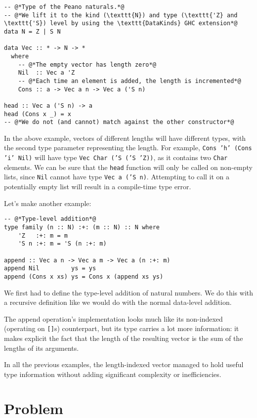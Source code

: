 \begin{lstlisting}[caption=A length-indexed vector]
-- @*Type of the Peano naturals.*@
-- @*We lift it to the kind (\texttt{N}) and type (\texttt{'Z} and \texttt{'S}) level by using the \texttt{DataKinds} GHC extension*@
data N = Z | S N

data Vec :: * -> N -> *
  where
    -- @*The empty vector has length zero*@
    Nil  :: Vec a 'Z
    -- @*Each time an element is added, the length is incremented*@
    Cons :: a -> Vec a n -> Vec a ('S n)

head :: Vec a ('S n) -> a
head (Cons x _) = x
-- @*We do not (and cannot) match against the other constructor*@
\end{lstlisting}

In the above example, vectors of different lengths will have different types, with the second type parameter representing the length.
For example, \texttt{Cons 'h' (Cons 'i' Nil)} will have type \texttt{Vec Char ('S ('S 'Z))}, as it contains two \texttt{Char} elements.
We can be sure that the \texttt{head} function will only be called on non-empty lists, since \texttt{Nil} cannot have type \texttt{Vec a ('S n)}.
Attempting to call it on a potentially empty list will result in a compile-time type error.

Let's make another example:

\begin{lstlisting}[caption=Appending a \texttt{Vec} to another]
-- @*Type-level addition*@
type family (n :: N) :+: (m :: N) :: N where
    'Z   :+: m = m
    'S n :+: m = 'S (n :+: m)

append :: Vec a n -> Vec a m -> Vec a (n :+: m)
append Nil         ys = ys
append (Cons x xs) ys = Cons x (append xs ys)
\end{lstlisting}

We first had to define the type-level addition of natural numbers. We do this with a recursive definition like we would do with the normal data-level addition.

The append operation's implementation looks much like its non-indexed (operating on \texttt{[]}s) counterpart, but its type carries a lot more information: it makes explicit the fact that the length of the resulting vector is the sum of the lengths of its arguments.

In all the previous examples, the length-indexed vector managed to hold useful type information without adding significant complexity or inefficiencies.

\section{Problem}
\label{sec:problem}

